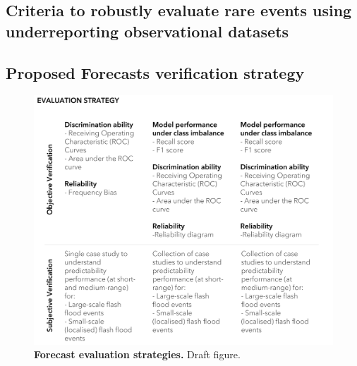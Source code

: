 \subsection{Criteria to robustly evaluate rare events using underreporting observational datasets}


\subsection{Proposed Forecasts verification strategy}

\begin{figure}[htbp]
\centering
\includegraphics[width=\textwidth]{forecast_evaluatio_strategy.png}
\caption{\textbf{Forecast evaluation strategies.} Draft figure.}
\label{fig:forecast_evaluatio_strategy}
\end{figure}


